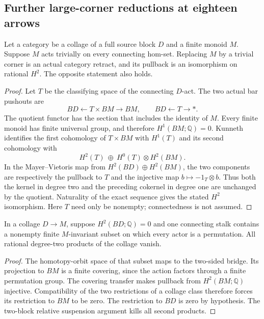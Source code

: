 \subsection{Further large-corner reductions at eighteen arrows}

\begin{lemma}
\label{CP2:A-trivial-cut-H2}
Let a category be a collage of a full source block $D$ and a
finite monoid $M$. Suppose $M$ acts trivially on every connecting
hom-set. Replacing $M$ by a trivial corner is an actual category
retract, and its pullback is an isomorphism on rational $H^2$.
The opposite statement also holds.
\end{lemma}
\begin{proof}
Let $T$ be the classifying space of the connecting $D$-act.
The two actual bar pushouts are
\[
 BD\longleftarrow T\times BM\longrightarrow BM,
 \qquad BD\longleftarrow T\longrightarrow *.
\]
The quotient functor has the section that includes the identity
of $M$. Every finite monoid has finite universal group, and
therefore $H^1(BM;\mathbb Q)=0$. Kunneth identifies the first
cohomology of $T\times BM$ with $H^1(T)$ and its second
cohomology with
\[
 H^2(T)\ \oplus\ H^0(T)\otimes H^2(BM).
\]
In the Mayer--Vietoris map from $H^2(BD)\oplus H^2(BM)$,
the two components are respectively the pullback to $T$ and
the injective map $b\mapsto-1_T\otimes b$.
Thus both the kernel in degree two and the preceding cokernel
in degree one are unchanged by the quotient. Naturality of
the exact sequence gives the stated $H^2$ isomorphism.
Here $T$ need only be nonempty; connectedness is not assumed.
\end{proof}

\begin{lemma}
\label{CP2:A-permutation-fiber-cups}
In a collage $D\to M$, suppose $H^2(BD;\mathbb Q)=0$ and
one connecting stalk contains a nonempty finite $M$-invariant
subset on which every actor is a permutation. All rational
degree-two products of the collage vanish.
\end{lemma}
\begin{proof}
The homotopy-orbit space of that subset maps to the two-sided
bridge. Its projection to $BM$ is a finite covering, since
the action factors through a finite permutation group. The
covering transfer makes pullback from $H^2(BM;\mathbb Q)$
injective. Compatibility of the two restrictions of a collage
class therefore forces its restriction to $BM$ to be zero.
The restriction to $BD$ is zero by hypothesis. The two-block
relative suspension argument kills all second products.
\end{proof}

